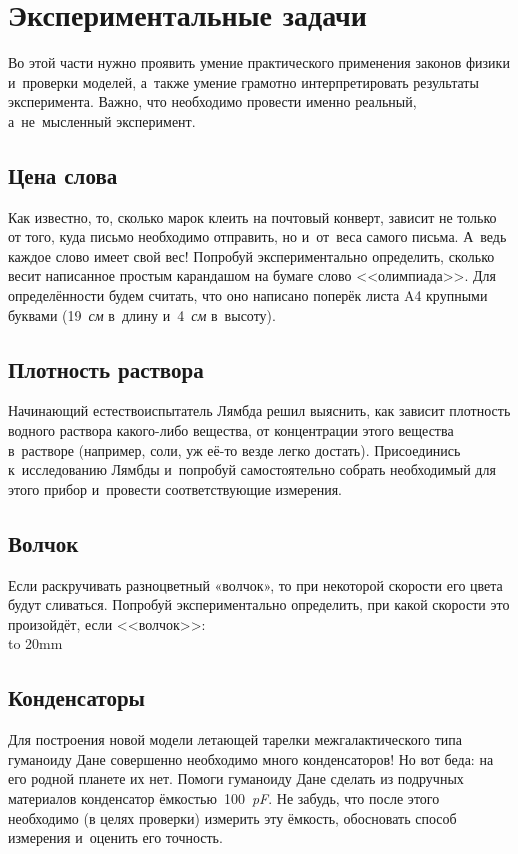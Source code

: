 \documentclass[a4paper,12pt]{article}
\begin{document}
\section{Экспериментальные задачи}

Во этой части нужно проявить умение практического применения законов физики
и~проверки моделей, а~также умение грамотно интерпретировать результаты
эксперимента. Важно, что необходимо провести именно реальный,
а~не~мысленный эксперимент.

\subsection{Цена слова}
Как известно, то, сколько марок клеить на почтовый конверт, зависит не только от того,
куда письмо необходимо отправить, но и~от~веса самого письма. А~ведь каждое слово имеет
свой вес! Попробуй экспериментально определить, сколько весит написанное простым
карандашом на бумаге слово <<олимпиада>>. Для определённости будем считать, что
оно написано поперёк листа A4 крупными буквами (19~\emph{см} в~длину и~4~\emph{см} в~высоту).

\subsection{Плотность раствора}
Начинающий естествоиспытатель Лямбда решил выяснить, как зависит плотность
водного раствора какого-либо вещества, от концентрации этого вещества
в~растворе (например, соли, уж её-то везде легко достать). Присоединись
к~исследованию Лямбды и~попробуй самостоятельно собрать необходимый
для этого прибор и~провести соответствующие измерения.

\subsection{Волчок}
Если раскручивать разноцветный «волчок», то при некоторой скорости его цвета будут сливаться.
Попробуй экспериментально определить, при какой скорости это произойдёт, если <<волчок>>:\\
\vbox to 20mm{
\vss
{}
\vss}

\subsection{Конденсаторы}
Для построения новой модели летающей тарелки межгалактического типа гуманоиду Дане
совершенно необходимо много конденсаторов! Но вот беда: на его родной планете их нет.
Помоги гуманоиду Дане сделать из подручных материалов конденсатор ёмкостью~100~\emph{pF}.
Не забудь, что после этого необходимо (в  целях проверки) измерить эту ёмкость,
обосновать способ измерения и~оценить его точность.
\end{document}
